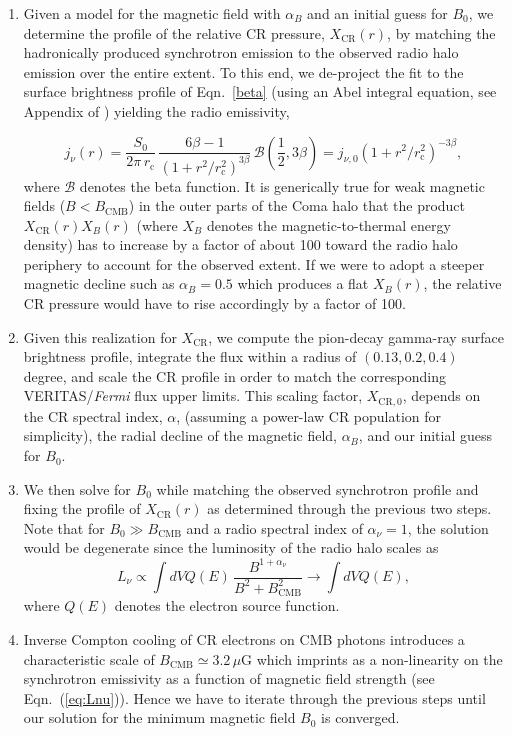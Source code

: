 \documentclass[12pt,manuscript]{aastex}
\def\Fermi{{\em Fermi}\xspace}
\newcommand{\rmn}{\mathrm}
\newcommand{\CR}{\mathrm{CR}}
\begin{document}
\begin{enumerate}
\item
Given a model for the magnetic field with $\alpha_B$ and an initial guess for $B_0$, we determine
the profile of the relative CR pressure, $X_{\CR}(r)$, by matching the hadronically produced
synchrotron emission to the observed radio halo emission over the entire extent. To 
this end, we de-project the fit to the surface brightness profile of Eqn.~\ref{beta} (using an Abel
integral equation, see Appendix of \citealt{article:PfrommerEnsslin:2004b}) yielding the radio
emissivity,

\begin{equation}
\label{eq:Coma:radio}
j_{\nu} (r) = \frac{S_{0}}{2\pi\, r_{\rmn{c}}}\,
\frac{6\beta - 1}{\left(1 + r^{2}/r_{\rmn{c}}^{2}\right)^{3 \beta}}\,
\mathcal{B}\left(\frac{1}{2}, 3\beta\right)
= j_{\nu,0} \left(1 + r^2/r_{\rmn{c}}^{2}\right)^{-3 \beta},
\end{equation}
where $\mathcal{B}$ denotes the beta function. It is generically true for weak magnetic fields
($B<B_{\rmn{CMB}}$) in the outer parts of the Coma halo that the product $X_{\CR}(r)X_{B}(r)$
(where $X_B$ denotes the magnetic-to-thermal energy density) has to increase by a factor of about
100 toward the radio halo periphery to account for the observed extent. If we were to adopt a
steeper magnetic decline such as $\alpha_{B}=0.5$ which produces a flat $X_{B}(r)$, the relative CR
pressure would have to rise accordingly by a factor of 100.

\item
Given this realization for $X_{\CR}$, we compute the pion-decay gamma-ray surface brightness
profile, integrate the flux within a radius of $(0.13, 0.2, 0.4)$ degree, and scale the CR profile
in order to match the corresponding VERITAS/\Fermi flux upper limits. This scaling factor,
$X_{\CR,0}$, depends on the CR spectral index, $\alpha$, (assuming a power-law CR population for
simplicity), the radial decline of the magnetic field, $\alpha_{B}$, and our initial guess for
$B_{0}$.

\item
We then solve for $B_{0}$ while matching the observed synchrotron profile and fixing the profile
of $X_{\CR}(r)$ as determined through the previous two steps. Note
that for $B_{0} \gg B_{\rmn{CMB}}$ and a radio spectral index of $\alpha_{\nu}=1$, the solution
would be degenerate since the luminosity of the radio halo scales as
\begin{equation}
\label{eq:Lnu}
L_{\nu} \propto \int dV Q(E)\,\frac{B^{1+\alpha_\nu}}{B^2 + B_{\rmn{CMB}}^2} \to \int dV Q(E),
\end{equation}
where $Q(E)$ denotes the electron source function.

\item Inverse Compton cooling of CR electrons on CMB photons introduces a characteristic scale of
  $B_{\rmn{CMB}}\simeq 3.2\,\mu$G which imprints as a non-linearity on the synchrotron emissivity as
  a function of magnetic field strength (see Eqn.~(\ref{eq:Lnu})). Hence we have to iterate through
  the previous steps until our solution for the minimum magnetic field $B_{0}$ is converged.
\end{enumerate}
\end{document}
